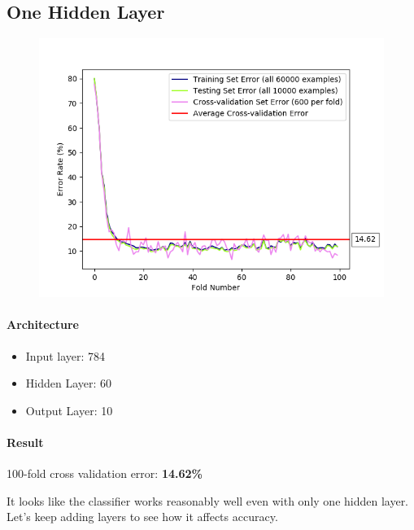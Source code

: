 \documentclass[11pt]{article}
\makeatletter
\def\maxwidth{\ifdim\Gin@nat@width>\linewidth\linewidth
    \else\Gin@nat@width\fi}
\let\Oldincludegraphics\includegraphics
\renewcommand{\includegraphics}[1]{\Oldincludegraphics[width=.8\maxwidth]{#1}}
\providecommand{\tightlist}{%
      \setlength{\itemsep}{0pt}\setlength{\parskip}{0pt}}
\makeatother
\begin{document}
\pagebreak

\subsection{One Hidden Layer}\label{one-hidden-layer}

\begin{figure}[htbp]
\centering
\includegraphics{plots/ff-numlayers-60.png}
\end{figure}

\paragraph{Architecture}\label{architecture-1}

\begin{itemize}
\tightlist
\item
  Input layer: 784
\item
  Hidden Layer: 60
\item
  Output Layer: 10
\end{itemize}

\paragraph{Result}\label{result}

100-fold cross validation error: \textbf{14.62\%}

It looks like the classifier works reasonably well even with only one
hidden layer. Let's keep adding layers to see how it affects accuracy.

\pagebreak
\end{document}
